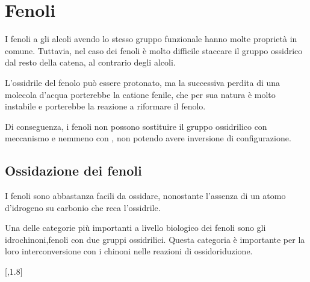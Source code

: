 \section{Fenoli}
I fenoli a gli alcoli avendo lo stesso gruppo funzionale hanno molte proprietà in comune. Tuttavia, nel caso dei fenoli è molto difficile staccare il gruppo ossidrico dal resto della catena, al contrario degli alcoli.

L'ossidrile del fenolo può essere protonato, ma la successiva perdita di una molecola d'acqua porterebbe la catione fenile, che per sua natura è molto instabile e porterebbe la reazione a riformare il fenolo.

Di conseguenza, i fenoli non possono sostituire il gruppo ossidrilico con meccanismo \mech[1] e nemmeno con \mech[2], non potendo avere inversione di configurazione.

\subsection{Ossidazione dei fenoli}
I fenoli sono abbastanza facili da ossidare, nonostante l'assenza di un atomo d'idrogeno su carbonio che reca l'ossidrile.

Una delle categorie più importanti a livello biologico dei fenoli sono gli idrochinoni,fenoli con due gruppi ossidrilici. Questa categoria è importante per la loro interconversione con i chinoni nelle reazioni di ossidoriduzione.

\begin{reaction}
	[,1.8]
\end{reaction}